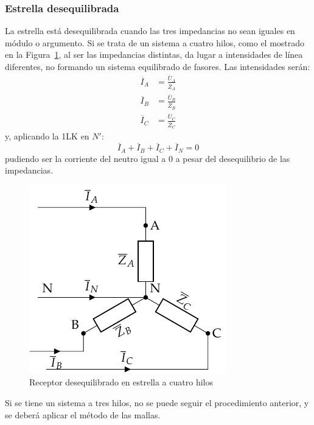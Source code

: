 \documentclass[11pt]{book} %
\begin{document}
	\subsubsection{Estrella desequilibrada}
	
	La estrella está desequilibrada cuando las tres impedancias no sean iguales en módulo o argumento. Si se trata de un sistema a cuatro hilos, como el mostrado en la Figura~\ref{fig.estrelladeseqiulibrado_4hilos}, al ser las impedancias distintas, da lugar a intensidades de línea diferentes, no formando un sistema equilibrado de fasores. Las intensidades serán: 
	\begin{align*}
      \overline{I}_A &= \frac{\overline{U}_A}{\overline{Z}_A}\\
      \overline{I}_B &= \frac{\overline{U}_B}{\overline{Z}_B}\\
      \overline{I}_C &= \frac{\overline{U}_C}{\overline{Z}_C}
    \end{align*}
    y, aplicando la 1LK en $N'$:
    \begin{equation}
        \overline{I}_A  + \overline{I}_B + \overline{I}_C + \overline{I}_N = 0
    \end{equation}
	pudiendo ser la corriente del neutro igual a 0 a pesar del desequilibrio de las impedancias. 
	
	\begin{figure}
	    \centering
	    \includegraphics{../figs/EstrellaDesequilibrado_Receptor.pdf}
	    \caption{Receptor desequilibrado en estrella a cuatro hilos}
	    \label{fig.estrelladeseqiulibrado_4hilos}
	\end{figure}
	
	Si se tiene un sistema a tres hilos, no se puede seguir el procedimiento anterior, y se deberá aplicar el método de las mallas. 
	
\end{document}
